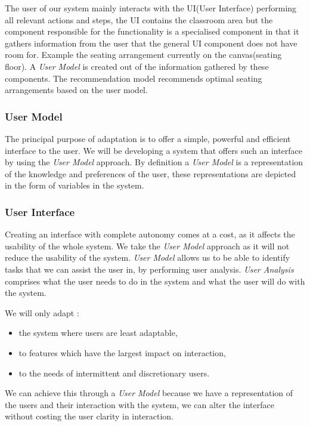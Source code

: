 The user of our system mainly interacts with the UI(User Interface) performing all relevant actions and steps, the UI contains the classroom area but the component responsible for the functionality is a specialised component in that it gathers information from the user that the general UI component does not have room for. Example the seating arrangement currently on the canvas(seating floor). A \emph{User Model} is created out of the information gathered by these components. The recommendation model recommends optimal seating arrangements based on the user model. 

\subsubsection{User Model}
The principal purpose of adaptation is to offer a simple, powerful and efficient interface to the user. We will be developing a system that offers such an interface by using the \emph{User Model} approach. By definition a \emph{User Model} is a representation of the knowledge and preferences of the user, these representations are depicted in the form of variables in the system.

\subsubsection{User Interface}
Creating an interface with complete autonomy comes at a cost, as it affects the usability of the whole system.  We take the \emph{User Model} approach as it will not reduce the usability of the system. \emph{User Model} allows us to be able to identify tasks that we can assist the user in, by performing user analysis. \emph{User Analysis} comprises what the user needs to do in the system and what the user will do with the system.

We will only adapt :
\begin{itemize}
    \item the system where users are least adaptable,
    \item to features which have the largest impact on interaction,
    \item to the needs of intermittent and discretionary users. \cite{benyon1993adaptive} 
\end{itemize}

We can achieve this through a \emph{User Model} because we have a representation of the users and their interaction with the system, we can alter the interface without costing the user clarity in interaction.


